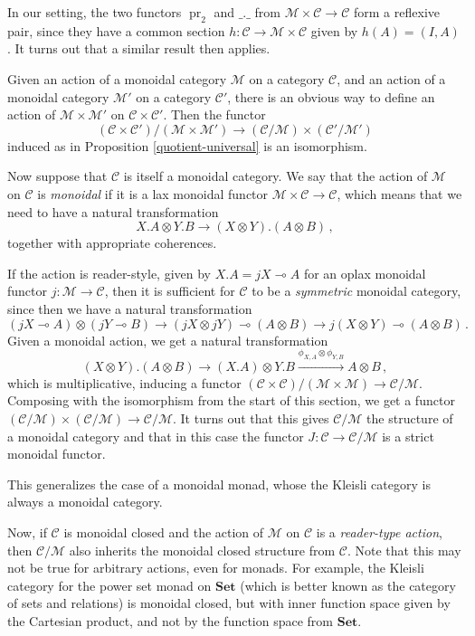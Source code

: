 \documentclass{svproc}
\newcommand\C{\mathcal{C}}
\newcommand\M{\mathcal{M}}
\DeclareMathOperator\pr{pr}
\newcommand\tensor\otimes
\renewcommand\implies\multimap
\newcommand*\from{\colon}
\newcommand{\0}{{\mathtt{0}}} \newcommand{\com}{{\mathtt{com}}}
\newcommand{\catname}[1]{\mathbf{#1}}
\newcommand{\Set}{\catname{Set}}
\begin{document}
In our setting, the two functors $\pr_2$ and $\_.\_$ from $\M\times\C \to \C$ form a reflexive pair, since they have a common section $h\from \C \to \M\times \C$ given by $h(A) = (I, A)$.  
It turns out that a similar result then applies.

\begin{proposition}
  Given an action of a monoidal category $\M$ on a category $\C$, and an action of a monoidal category $\M'$ on a category $\C'$, there is an obvious way to define an action of $\M\times\M'$ on $\C\times\C'$.  
  Then the functor
  \[
    (\C\times\C')/(\M\times\M') \to (\C/\M) \times (\C'/\M')
    \]
  induced as in Proposition \ref{quotient-universal} is an isomorphism.
  \label{monoidality}
\end{proposition}

Now suppose that $\C$ is itself a monoidal category.  
We say that the action of $\M$ on $\C$ is \emph{monoidal} if it is a lax monoidal functor $\M\times\C\to\C$, which means that we need to have a natural transformation 
\[
  X.A\tensor Y.B\to (X\tensor Y).(A\tensor B)\,,
  \]
together with appropriate coherences.  

If the action is reader-style, given by $X.A = jX \implies A$ for an oplax monoidal functor $j\from \M\to \C$, then it is sufficient for $\C$ to be a \emph{symmetric} monoidal category, since then we have a natural transformation
\[
  (j X \implies A) \tensor (j Y \implies B)
  \rightarrow
  (j X \tensor j Y) \implies (A \tensor B)
  \rightarrow
  j (X\tensor Y) \implies (A \tensor B)\,.
  \]
Given a monoidal action, we get a natural transformation
\[
  (X\tensor Y).(A\tensor B)
  \rightarrow
  (X.A)\tensor Y.B
  \xrightarrow{\phi_{X,A}\tensor \phi_{Y,B}}
  A\tensor B\,,
  \]
which is multiplicative, inducing a functor $(\C\times\C)/(\M\times\M)\to \C/\M$.  
Composing with the isomorphism from the start of this section, we get a functor $(\C/\M)\times(\C/\M)\to\C/\M$.  
It turns out that this gives $\C/\M$ the structure of a monoidal category and that in this case the functor $J\from \C\to\C/\M$ is a strict monoidal functor.

This generalizes the case of a monoidal monad, whose the Kleisli category is always a monoidal category.

Now, if $\C$ is monoidal closed and the action of $\M$ on $\C$ is a \emph{reader-type action}, then $\C/\M$ also inherits the monoidal closed structure from $\C$.  
Note that this may not be true for arbitrary actions, even for monads.  
For example, the Kleisli category for the power set monad on $\Set$ (which is better known as the category of sets and relations) is monoidal closed, but with inner function space given by the Cartesian product, and not by the function space from $\Set$.
\end{document}
